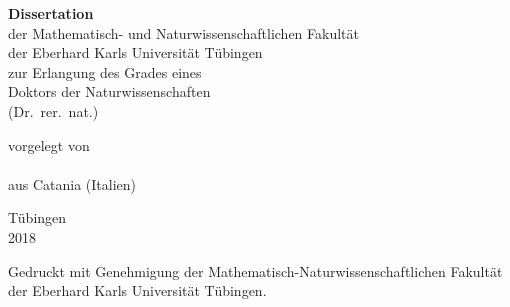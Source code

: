 {
\pagestyle{empty}
\setlength{\parskip}{0pt}
\setlength{\parindent}{0pt}
\large
\sffamily
\linespread{1.5}
\selectfont
\begin{titlepage}
\makeatletter %
\centering
%
\selectfont


{\linespread{1.3} \bfseries \Huge \selectfont
  \@title%
  \par%
}


{\bfseries Dissertation}\\
der Mathematisch- und Naturwissenschaftlichen Fakult\"at\\
der Eberhard Karls Universit\"at T\"ubingen\\
zur Erlangung des Grades eines\\
Doktors der Naturwissenschaften\\
(Dr.\ rer.\ nat.)


vorgelegt von \\
\@author \\
aus Catania (Italien)


T\"ubingen\\
2018

\end{titlepage}
\clearpage
%
\vspace*{\fill}

Gedruckt mit Genehmigung der Mathematisch-Naturwissenschaftlichen Fakultät der
Eberhard Karls Universität Tübingen.

}
